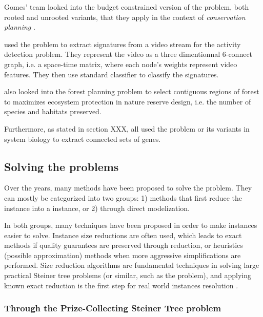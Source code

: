 		Gomes' team looked into the budget constrained version of the problem, both rooted and unrooted variants, that they apply in the context of \emph{conservation planning} \parencites{conrad2007connections}{gomes2008connections}{dilkina2010solving}.

		\Textcite{chen2012efficient} used the \mwcs{} problem to extract signatures from a video stream for the activity detection problem. They represent the video as a three dimentionnal 6-connect graph, i.e. a space-time matrix, where each node's weights represent video features. They then use standard classifier to classify the signatures.

		\Textcite{carvajal2013imposing} also looked into the forest planning problem to select contiguous regions of forest to maximizes ecosystem protection in nature reserve design, i.e. the number of species and habitats preserved.

		Furthermore, as stated in section XXX, \textcites{dittrich2008identifying}{yamamoto2009better}{backes2012integer}{mitra2013integrative} all used the \mwcs{} problem or its variants in system biology to extract connected sets of genes.



	\subsection{Solving the \mwcs{} problems}
	\label{subsec:solvingmwcs}

	Over the years, many methods have been proposed to solve the \mwcs{} problem.
	They can mostly be categorized into two groups: 1) methods that first reduce the \mwcs{} instance into a \pcst{} instance, or 2) through direct modelization.

	In both groups, many techniques have been proposed in order to make instances easier to solve.
	Instance size reductions are often used, which leads to exact methods if quality guarantees are preserved through reduction, or heuristics (possible approximation) methods when more aggressive simplifications are performed.
	Size reduction algorithms are fundamental techniques in solving large practical Steiner tree problems (or similar, such as the \mwcs{} problem), and applying known exact reduction is the first step for real world instances resolution \parencite{polzin2003algorithms}.

	\subsubsection{Through the Prize-Collecting Steiner Tree problem}

